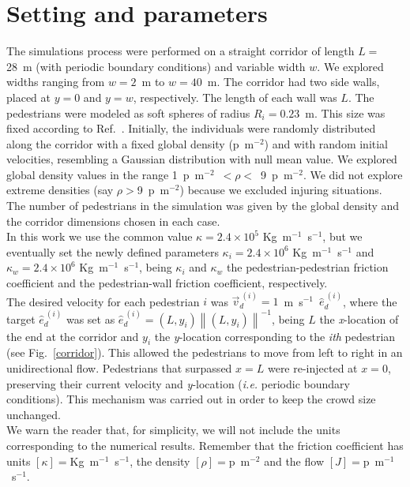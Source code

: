 \documentclass[preprint,12pt]{elsarticle}
\begin{document}
\section{\label{simulations}Setting and parameters}

The simulations process were performed on a straight corridor of length $L=$ 
28~m (with periodic boundary conditions) and variable width $w$. We explored 
widths ranging from $w=2$~m to $w=40$~m. The corridor had two side walls, placed 
at $y=0$ and $y=w$, respectively. The length of each wall was $L$. The 
pedestrians were modeled as soft spheres of radius $R_i=0.23$~m. This size was 
fixed according to Ref.~\cite{metric_handbook}. Initially, the individuals were 
randomly distributed along the corridor with a fixed global density 
(p~m$^{-2}$) and with random initial velocities, resembling a 
Gaussian distribution with null mean value. We explored global density values in 
the range 1~p~m$^{-2}$~$<\rho<$~9~p~m$^{-2}$. 
We did not explore extreme densities (say $\rho>$9~p~m$^{-2}$) 
because we excluded injuring situations. The number of pedestrians in the 
simulation was given by the global density and the corridor dimensions chosen in 
each case. \\

In this work we use the common value $\kappa=2.4 \times 
10^{5}$ Kg~m$^{-1}$~s$^{-1}$, but we eventually set the newly defined 
parameters $\kappa_i=2.4 \times 10^{6}$ Kg~m$^{-1}$~s$^{-1}$  and $\kappa_w=2.4 
\times 10^{6}$ Kg~m$^{-1}$~s$^{-1}$, being $\kappa_i$ and $\kappa_w$ the 
pedestrian-pedestrian friction coefficient and the pedestrian-wall friction 
coefficient, respectively. \\

The desired velocity for each pedestrian $i$ was 
$\vec{v}_d^{~(i)}=1$~m~s$^{-1}$~$\hat{e}_d^{~(i)}$, where the target $\hat{e}_d^{~(i)}$ 
was set as $\hat{e}_d^{~(i)}=(L,y_i)\left \| (L,y_i) \right \|^{-1}$, being $L$ 
the \textit{x}-location of the end at the corridor and $y_i$ the 
\textit{y}-location corresponding to the \textit{ith} pedestrian 
(see Fig.~\ref{corridor}). This allowed the pedestrians to 
move from left to right in an unidirectional flow. Pedestrians that surpassed 
$x=L$ were re-injected at $x=0$, preserving their current velocity and 
\textit{y}-location (\textit{i.e.} periodic boundary conditions). This mechanism 
was carried out in order to keep
the crowd size unchanged.\\

We warn the reader that, for simplicity, we will not include the units 
corresponding to the numerical results. Remember that the friction coefficient 
has units $\left [ \kappa \right]=$Kg~m$^{-1}$~s$^{-1}$, the density $\left [ 
\rho \right]=$p~m$^{-2}$ and the flow $\left [ J \right 
]=$p~m$^{-1}$~s$^{-1}$.\\
\end{document}
